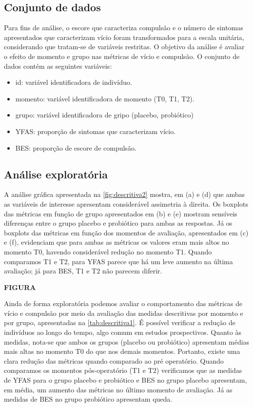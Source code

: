 \documentclass[AMA,STIX1COL]{WileyNJD-v2}
\begin{document}
\subsection{Conjunto de dados}

Para fins de análise, o escore que caracteriza compulsão e o número de sintomas apresentados que caracterizam vício foram transformados para a escala unitária, considerando que tratam-se de variáveis restritas. O objetivo da análise é avaliar o efeito de momento e grupo nas métricas de vício e compulsão. O conjunto de dados contém as seguintes variáveis:

\begin{itemize}
  \item id: variável identificadora de indivíduo.
  \item momento: variável identificadora de momento (T0, T1, T2).
  \item grupo: variável identificadora de gripo (placebo, probiótico)
  \item YFAS: proporção de sintomas que caracterizam vício.
  \item BES: proporção de escore de compulsão.
\end{itemize}

\subsection{Análise exploratória}

A análise gráfica apresentada na \autoref{fig:descritiva2} mostra, em (a) e (d) que ambas as variáveis de interesse apresentam considerável assimetria à direita. Os boxplots das métricas em função de grupo apresentados em (b) e (e) mostram sensíveis diferenças entre o grupo placebo e probiótico para ambas as respostas. Já os boxplots das métricas em função dos momentos de avaliação, apresentados em (c) e (f), evidenciam que para ambas as métricas os valores eram mais altos no momento T0, havendo considerável redução no momento T1. Quando comparamos T1 e T2, para YFAS parece que há um leve aumento na última avaliação; já para BES, T1 e T2 não parecem diferir.  

\textbf{FIGURA}

Ainda de forma exploratória podemos avaliar o comportamento das métricas de vício e compulsão por meio da avaliação das medidas descritivas por momento e por grupo, apresentadas na \autoref{tab:descritiva1}. É possível verificar a redução de indivíduos ao longo do tempo, algo comum em estudos prospectivos. Quanto às medidas, nota-se que ambos os grupos (placebo ou probiótico) apresentam médias mais altas no momento T0 do que nos demais momentos. Portanto, existe uma clara redução das métricas quando comparado ao pré operatório. Quando comparamos os momentos pós-operatório (T1 e T2) verificamos que as medidas de YFAS para o grupo placebo e probiótico e BES no grupo placebo apresentam, em média, um aumento das métricas no último momento de avaliação. Já as medidas de BES no grupo probiótico apresentam queda.
\end{document}
